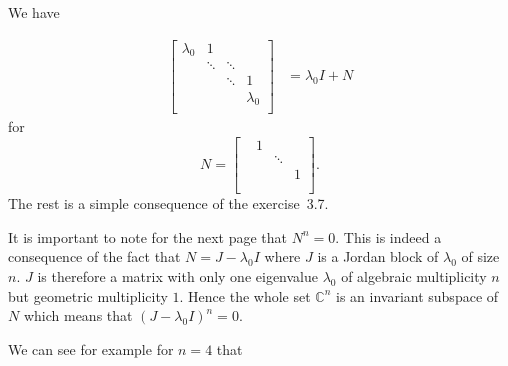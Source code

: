 \begin{solution}
	We have
	
	\begin{align*}
	\begin{bmatrix}
	\lambda_0 & 1      &        & \\
	& \ddots & \ddots & \\
	&        & \ddots & 1\\
	&        &        & \lambda_0\\
	\end{bmatrix}
	& =
	\lambda_0 I + N
	\end{align*}
	for
	\[
	N =
	\begin{bmatrix}
	& 1 &        & \\
	&   & \ddots & \\
	&   &        & 1\\
	&   &        & \\
	\end{bmatrix}.
	\]
	The rest is a simple consequence of the exercise~3.7.
	
	It is important to note for the next page that $N^n = 0$.
	This is indeed a consequence of the fact that $N = J - \lambda_0I$
	where $J$ is a Jordan block of $\lambda_0$ of size $n$.
	$J$ is therefore a matrix with only one eigenvalue $\lambda_0$
	of algebraic multiplicity $n$ but geometric multiplicity $1$.
	Hence the whole set $\mathbb{C}^n$ is an invariant subspace of $N$
	which means that $(J - \lambda_0I)^n = 0$.
	
	We can see for example for $n = 4$ that
	

\end{solution}
